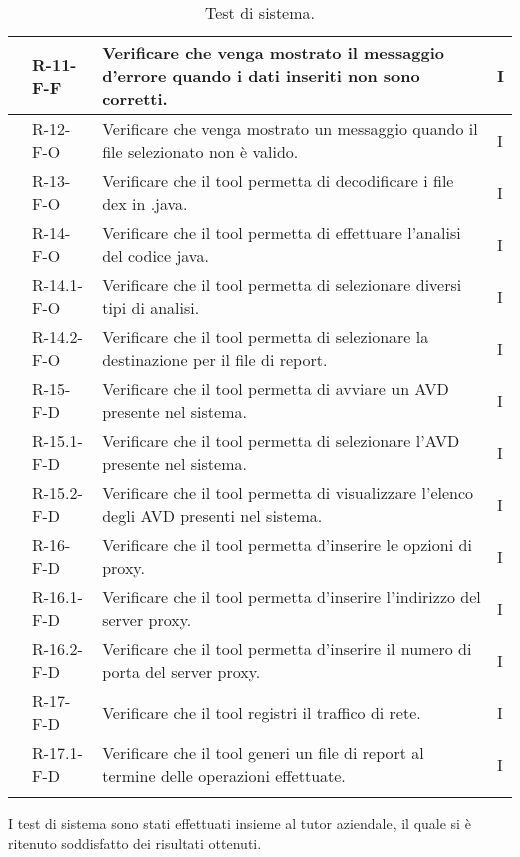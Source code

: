 \begin{longtable}{ | C{1.5cm} |C{2cm} |C{7cm} |C{1.5cm}|}
     & R-11-F-F   & Verificare che venga mostrato il messaggio d'errore quando i dati inseriti non sono corretti.& I \\\hline
     & R-12-F-O   & Verificare che venga mostrato un messaggio quando il file selezionato non è valido.& I \\\hline
     & R-13-F-O   & Verificare che il tool permetta di decodificare i file dex in .java.& I \\\hline
     & R-14-F-O   & Verificare che il tool permetta di effettuare l'analisi del codice java.& I \\\hline
     & R-14.1-F-O & Verificare che il tool permetta di selezionare diversi tipi di analisi.& I \\\hline
     & R-14.2-F-O & Verificare che il tool permetta di selezionare la destinazione per il file di report.& I \\\hline
     & R-15-F-D   & Verificare che il tool permetta di avviare un AVD presente nel sistema.& I \\\hline
     & R-15.1-F-D & Verificare che il tool permetta di selezionare l'AVD presente nel sistema.& I \\\hline
     & R-15.2-F-D & Verificare che il tool permetta di visualizzare l'elenco degli AVD presenti nel sistema.& I \\\hline
     & R-16-F-D   & Verificare che il tool permetta d'inserire le opzioni di proxy.& I \\\hline
     & R-16.1-F-D & Verificare che il tool permetta d'inserire l'indirizzo del server proxy.& I \\\hline
     & R-16.2-F-D & Verificare che il tool permetta d'inserire il numero di porta del server proxy.& I \\\hline
     & R-17-F-D   & Verificare che il tool registri il traffico di rete.& I \\\hline
     & R-17.1-F-D & Verificare che il tool generi un file di report al termine delle operazioni effettuate.& I \\\hline
    \caption{Test di sistema.}
\end{longtable}
\setcounter{subCount}{0}
\setcounter{rowcount}{0}
I test di sistema sono stati effettuati insieme al tutor aziendale, il quale si è ritenuto soddisfatto dei risultati ottenuti.

